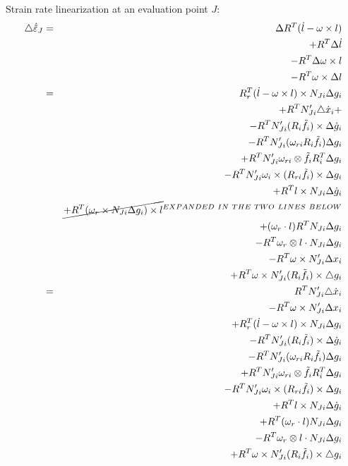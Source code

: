 Strain rate linearization at an evaluation point $J$:
\begin{eqnarray*}
\triangle\dot{\tilde{\varepsilon}}_{J} & = & \Delta R^{T}(\dot{l}-\omega\times l)\\
 &  & +R^{T}\Delta\dot{l}\\
 &  & -R^{T}\Delta\omega\times l\\
 &  & -R^{T}\omega\times\Delta l\\
 & = & R_{r}^{T}(\dot{l}-\omega\times l)\times N_{Ji}\Delta g_{i}\\
 &  & +R^{T}N_{Ji}'\triangle\dot{x}_{i}+\\
 &  & -R^{T}N_{Ji}'(R_{i}\tilde{f}_{i})\times\Delta\dot{g}_{i}\\
 &  & -R^{T}N_{Ji}'(\omega_{ri}R_{i}\tilde{f}_{i})\Delta g_{i}\\
 &  & +R^{T}N_{Ji}'\omega_{ri}\otimes\tilde{f}_{i}R_{i}^{T}\Delta g_{i}\\
 &  & -R^{T}N_{Ji}'\omega_{i}\times(R_{ri}\tilde{f}_{i})\times\Delta g_{i}\\
 &  & +R^{T}l\times N_{Ji}\Delta\dot{g}_{i}\\
 &  & \cancel{+R^{T}(\omega_{r}\times N_{Ji}\Delta g_{i})\times l}^{EXPANDED\ IN\ THE\ TWO\ LINES\ BELOW}\\
 &  & +(\omega_{r}\cdot l)R^{T}N_{Ji}\Delta g_{i}\\
 &  & -R^{T}\omega_{r}\otimes l\cdot N_{Ji}\Delta g_{i}\\
 &  & -R^{T}\omega\times N'_{Ji}\Delta x_{i}\\
 &  & +R^{T}\omega\times N'_{Ji}(R_{i}\tilde{f_{i}})\times\triangle g_{i}\\
 & = & R^{T}N_{Ji}'\triangle\dot{x}_{i}\\
 &  & -R^{T}\omega\times N'_{Ji}\Delta x_{i}\\
 &  & +R_{r}^{T}(\dot{l}-\omega\times l)\times N_{Ji}\Delta g_{i}\\
 &  & -R^{T}N_{Ji}'(R_{i}\tilde{f}_{i})\times\Delta\dot{g}_{i}\\
 &  & -R^{T}N_{Ji}'(\omega_{ri}R_{i}\tilde{f}_{i})\Delta g_{i}\\
 &  & +R^{T}N_{Ji}'\omega_{ri}\otimes\tilde{f}_{i}R_{i}^{T}\Delta g_{i}\\
 &  & -R^{T}N_{Ji}'\omega_{i}\times(R_{ri}\tilde{f}_{i})\times\Delta g_{i}\\
 &  & +R^{T}l\times N_{Ji}\Delta\dot{g}_{i}\\
 &  & +R^{T}(\omega_{r}\cdot l)N_{Ji}\Delta g_{i}\\
 &  & -R^{T}\omega_{r}\otimes l\cdot N_{Ji}\Delta g_{i}\\
 &  & +R^{T}\omega\times N'_{Ji}(R_{i}\tilde{f_{i}})\times\triangle g_{i}
\end{eqnarray*}

